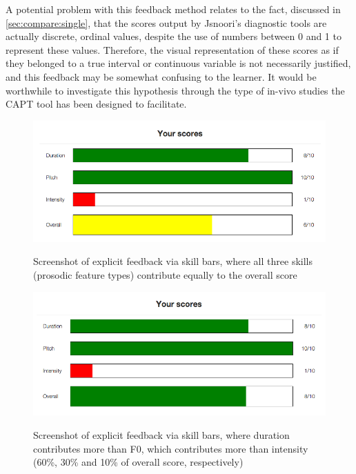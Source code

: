 		  A potential problem with this feedback method relates to the fact, discussed in \cref{sec:compare:single}, that the scores output by Jsnoori's diagnostic tools are actually discrete, ordinal values, despite the use of numbers between 0 and 1 to represent these values. Therefore, the visual representation of these scores as if they belonged to a true interval or continuous variable is not necessarily justified, and this feedback may be somewhat confusing to the learner. It would be worthwhile to investigate this hypothesis through the type of in-vivo studies the CAPT tool has been designed to facilitate. 
		
		
			\begin{figure}
			\centering
			\caption[Skill bars as explicit feedback]{Screenshot of explicit feedback via skill bars, where all three skills (prosodic feature types) contribute equally to the overall score}
			\includegraphics[width=\textwidth]{img/screenshots/skillBars-balanced-of10}
			\label{fig:skillbars:balanced}
			\end{figure}		
			
			\begin{figure}
			\centering
			\caption[Skill bars with unequal skill weights]{Screenshot of explicit feedback via skill bars, where duration contributes more than F0, which contributes more than intensity (60\%, 30\% and 10\% of overall score, respectively) }
			\includegraphics[width=\textwidth]{img/screenshots/skillBars-durPriority}
			\label{fig:skillbars:durpriority}
			\end{figure}	
		
